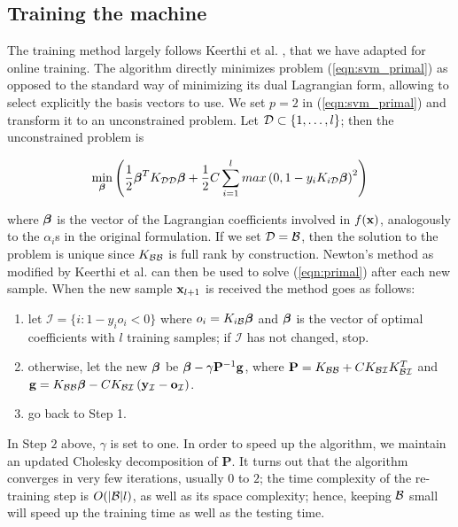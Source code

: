 \subsection{Training the machine}

The training method largely follows Keerthi et
al. \cite{KeerthiDC05,KeerthiCDC06}, that we have adapted for online
training. The algorithm directly minimizes problem
(\ref{eqn:svm_primal}) as opposed to the standard way of minimizing
its dual Lagrangian form, allowing to select explicitly the basis
vectors to use. We set $p=2$ in (\ref{eqn:svm_primal}) and transform
it to an unconstrained problem.  Let $\mathcal{D} \subset \{1,\ldots,l\}$; then
the unconstrained problem is

\begin{equation} \label{eqn:primal}
  \min_{\boldsymbol{\beta}} \left( 
      \frac{1}{2} \boldsymbol{\beta}^T K_{\mathcal{D}\mathcal{D}} \boldsymbol{\beta}
    + \frac{1}{2} C \sum_{i=1}^l max \left(0,1-y_i K_{i\mathcal{D}} \boldsymbol{\beta} \right)^2
  \right)
\end{equation}

\noindent where $\boldsymbol{\beta}$ is the vector of the Lagrangian coefficients involved
in $f(\mathbf{x})$, analogously to the $\alpha_i$s in the original
formulation. If we set $\mathcal{D} = \mathcal{B}$, then the solution to the problem is
unique since $K_{\mathcal{B}\mathcal{B}}$ is full rank by construction. Newton's method
as modified by Keerthi et al. \cite{KeerthiDC05,KeerthiCDC06} can then
be used to solve (\ref{eqn:primal}) after each new sample. When the
new sample $\mathbf{x}_{l+1}$ is received the method goes as follows:

\begin{enumerate}

   \item let $\mathcal{I} = \{ i: 1-y_i o_i<0 \}$ where $o_i =
     K_{i\mathcal{B}} \boldsymbol{\beta}$ and $\boldsymbol{\beta}$ is the vector of optimal coefficients
     with $l$ training samples; if $\mathcal{I}$ has not changed, stop.

   \item otherwise, let the new $\boldsymbol{\beta}$ be $\boldsymbol{\beta} - \gamma
     \mathbf{P}^{-1}\mathbf{g}$, where $\mathbf{P} = K_{\mathcal{B}\mathcal{B}} + C
     K_{\mathcal{B}\mathcal{I}} K_{\mathcal{B}\mathcal{I}}^T$ and $\mathbf{g} = K_{\mathcal{B}\mathcal{B}}
     \boldsymbol{\beta} - C K_{\mathcal{B}\mathcal{I}} \left(
     \mathbf{y}_{\mathcal{I}}-\mathbf{o}_{\mathcal{I}}\right)$.

   \item go back to Step 1.

\end{enumerate}

In Step $2$ above, $\gamma$ is set to one. In order to speed up the
algorithm, we maintain an updated Cholesky decomposition of
$\mathbf{P}$. It turns out that the algorithm converges in very few
iterations, usually $0$ to $2$; the time complexity of the re-training
step is $O(|\mathcal{B}|l)$, as well as its space complexity; hence, keeping
$\mathcal{B}$ small will speed up the training time as well as the testing
time.

